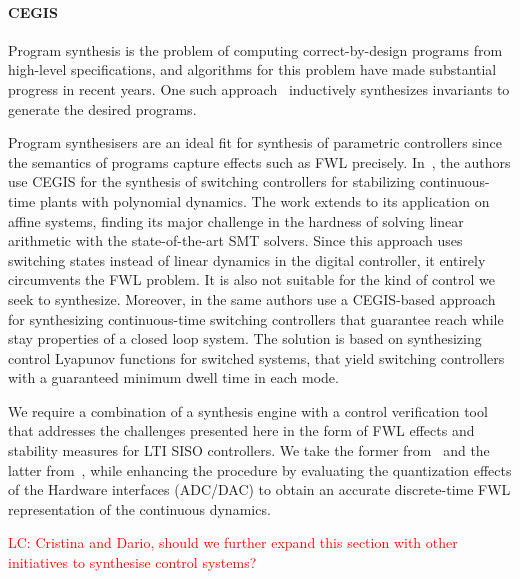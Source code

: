 \documentclass[runningheads,a4paper]{llncs}
\begin{document}
\paragraph{CEGIS}

Program synthesis is the problem of computing correct-by-design programs
from high-level specifications, and algorithms for this problem have made
substantial progress in recent years.  One such
approach~\cite{itzhaky2010simple} inductively synthesizes invariants to
generate the desired programs.

Program synthesisers are an ideal fit for synthesis of parametric
controllers since the semantics of programs capture effects such as FWL
precisely.  In~\cite{DBLP:conf/cdc/RavanbakhshS15}, the authors use CEGIS
for the synthesis of switching controllers for stabilizing continuous-time
plants with polynomial dynamics.  The work extends to its application on
affine systems, finding its major challenge in the hardness of solving
linear arithmetic with the state-of-the-art SMT solvers.  Since this
approach uses switching states instead of linear dynamics in the digital
controller, it entirely circumvents the FWL problem.  It is also not
suitable for the kind of control we seek to synthesize.
Moreover, in \cite{DBLP:conf/emsoft/RavanbakhshS16} the same authors 
use a CEGIS-based approach for synthesizing continuous-time switching
controllers that guarantee reach while stay properties of a closed
loop system. The solution is based on synthesizing control Lyapunov
functions for switched systems, that yield switching controllers with
a guaranteed minimum dwell time in each mode.

We require a
combination of a synthesis engine with a control verification tool that
addresses the challenges presented here in the form of FWL effects and
stability measures for LTI SISO controllers.  We take the former
from~\cite{DBLP:conf/lpar/DavidKL15} and the latter from~\cite{daes20161},
while enhancing the procedure by evaluating the quantization effects of the
Hardware interfaces (ADC/DAC) to obtain an accurate discrete-time FWL
representation of the continuous dynamics.




\textcolor{red}{LC: Cristina and Dario, should we further expand this section with other initiatives to synthesise control systems?}


  
\end{document}
